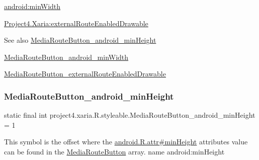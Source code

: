 {\ttfamily \hyperlink{classproject4_1_1xaria_1_1R_1_1styleable_a920044221a11dc23836e7a493af16c5b}{android\+:min\+Width}}

{\ttfamily \hyperlink{classproject4_1_1xaria_1_1R_1_1styleable_a91bce24bc490f2bcbffa0eb9d2c6e8f4}{Project4.\+Xaria\+:external\+Route\+Enabled\+Drawable}}

\begin{DoxySeeAlso}{See also}
\hyperlink{classproject4_1_1xaria_1_1R_1_1styleable_a986fd72a47ce21b2c727eaba93fd24a9}{Media\+Route\+Button\+\_\+android\+\_\+min\+Height} 

\hyperlink{classproject4_1_1xaria_1_1R_1_1styleable_a920044221a11dc23836e7a493af16c5b}{Media\+Route\+Button\+\_\+android\+\_\+min\+Width} 

\hyperlink{classproject4_1_1xaria_1_1R_1_1styleable_a91bce24bc490f2bcbffa0eb9d2c6e8f4}{Media\+Route\+Button\+\_\+external\+Route\+Enabled\+Drawable} 
\end{DoxySeeAlso}
\mbox{\label{classproject4_1_1xaria_1_1R_1_1styleable_a986fd72a47ce21b2c727eaba93fd24a9}} 
\subsubsection{\texorpdfstring{Media\+Route\+Button\+\_\+android\+\_\+min\+Height}{MediaRouteButton\_android\_minHeight}}
{\footnotesize\ttfamily static final int project4.\+xaria.\+R.\+styleable.\+Media\+Route\+Button\+\_\+android\+\_\+min\+Height = 1\hspace{0.3cm}{\ttfamily [static]}}

This symbol is the offset where the \hyperlink{}{android.\+R.\+attr\#min\+Height} attribute\textquotesingle{}s value can be found in the \hyperlink{classproject4_1_1xaria_1_1R_1_1styleable_afbc7b05aea080f3e7e5fb4051290a14d}{Media\+Route\+Button} array.  name android\+:min\+Height \mbox{\label{classproject4_1_1xaria_1_1R_1_1styleable_a920044221a11dc23836e7a493af16c5b}} 
